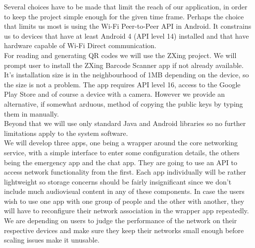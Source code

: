 Several choices have to be made that limit the reach of our application, in order to keep the project simple enough for the given time frame. Perhaps the choice that limits us most is using the Wi-Fi Peer-to-Peer API in Android. It constrains us to devices that have at least Android 4 (API level 14) installed and that have hardware capable of Wi-Fi Direct communication.\cite{P2PAPIGuide}\\
For reading and generating QR codes we will use the ZXing project\cite{ZXing}. We will prompt user to install the ZXing Barcode Scanner app if not already available. It's installation size is in the neighbourhood of 1MB depending on the device, so the size is not a problem. The app requires API level 16, access to the Google Play Store and of course a device with a camera. However we provide an alternative, if somewhat arduous, method of copying the public keys by typing them in manually.\\
Beyond that we will use only standard Java and Android libraries so no further limitations apply to the system software.\\
We will develop three apps, one being a wrapper around the core networking service, with a simple interface to enter some configuration details, the others being the emergency app and the chat app. They are going to use an API to access network functionality from the first. Each app individually will be rather lightweight so storage concerns should be fairly insignificant since we don't include much audiovisual content in any of these components. In case the users wish to use one app with one group of people and the other with another, they will have to reconfigure their network association in the wrapper app repeatedly.\\
We are depending on users to judge the performance of the network on their respective devices and make sure they keep their networks small enough before scaling issues make it unusable.\\
